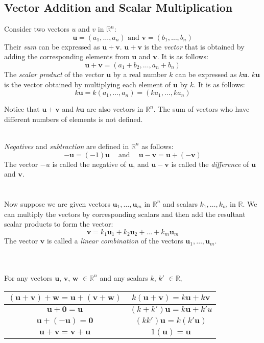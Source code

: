\documentclass[../setup.tex]{subfiles}
\begin{document}
\subsection{Vector Addition and Scalar Multiplication}
Consider two vectors $u$ and $v$ in $\mathbb{R}^n$:
\[\bm{u} = (a_1, \dots, a_n) \text{ and } \bm{v} = (b_1, \dots, b_n)\]
Their \textit{sum} can be expressed as $\bm{u} + \bm{v}$. $\bm{u} + \bm{v}$ is the \textit{vector} that is obtained by adding the corresponding elements from $\bm{u}$ and $\bm{v}$. It is as follows:
\[\bm{u} + \bm{v} = (a_1 + b_2, \dots, a_n + b_n)\]
The \textit{scalar product} of the vector $\bm{u}$ by a real number $k$ can be expressed as $k\bm{u}$. $k\bm{u}$ is the vector obtained by multiplying each element of $\bm{u}$ by $k$. It is as follows:
\[k\bm{u} = k(a_1, \dots, a_n) = (ka_1, \dots, ka_n)\]
\begin{remark}
Notice that $\bm{u} + \bm{v}$ and $k\bm{u}$ are also vectors in $\mathbb{R}^n$. The sum of vectors who have different numbers of elements is not defined.
\end{remark}
\phantom \\
\textit{Negatives} and \textit{subtraction} are defined in $\mathbb{R}^n$ as follows:
\[-\bm{u} = (-1)\bm{u} \ \ \ \ \text{ and }\ \ \ \  \bm{u} - \bm{v} = \bm{u} + (-\bm{v})\]
The vector $-u$ is called the negative of $\bm{u}$, and $\bm{u} - \bm{v}$ is called the \textit{difference} of $\bm{u}$ and $\bm{v}$. \\
\phantom \\ \\
Now suppose we are given vectors $\bm{u}_1, \dots, \bm{u}_m$ in $\mathbb{R}^n$ and scalars $k_1, \dots, k_m$ in $\mathbb{R}$. We can multiply the vectors by corresponding scalars and then add the resultant scalar products to form the vector:
\[\bm{v} = k_1\bm{u}_1 + k_2\bm{u}_2 + \dots + k_m\bm{u}_m\]
The vector $\bm{v}$ is called a \textit{linear combination} of the vectors $\bm{u}_1, \dots, \bm{u}_m$. \\
\phantom \\ \\
\begin{theorem}
For any vectors $\bm{u}$, $\bm{v}$, $\bm{w}$ $\in \mathbb{R}^n$ and any scalars $k$, $k'$ $\in \mathbb{R}$,
\begin{center}
\begin{tabular}[t]{| c | c |}
\hline
	$(\bm{u} + \bm{v}) + \bm{w} = \bm{u} + (\bm{v} + \bm{w})$ & $k(\bm{u} + \bm{v}) = k\bm{u} + k\bm{v}$ \\
\hline
	$\bm{u} + \boldsymbol{0} = \bm{u}$ & $(k + k')\bm{u} = k\bm{u} + k'u$ \\
\hline
	$\bm{u} + (-\bm{u}) = \boldsymbol{0}$ & $(kk')\bm{u} = k(k'\bm{u})$ \\
\hline
	$\bm{u} + \bm{v} = \bm{v} + \bm{u}$ & $1(\bm{u}) = \bm{u}$ \\
\hline
\end{tabular}
\end{center}
\end{theorem}
\end{document}
